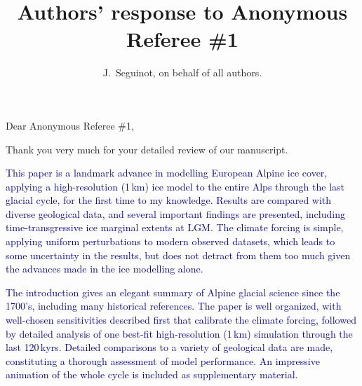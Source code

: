 

\title{Authors' response to Anonymous Referee \#1}
\author{J.~Seguinot, on behalf of all authors.}


\maketitle
\bigskip


\newcommand{\sechead}[1]{\bigskip\noindent\textbf{#1}}
\newcommand{\referee}[1]{\bigskip\noindent\textcolor{darkblue}{#1}}
\newcommand{\msquote}[1]{\begin{quote}\textit{#1}\end{quote}}
\newcommand{\doi}[1]{doi:\allowbreak\href{http://dx.doi.org/#1}{#1}}

    Dear Anonymous Referee \#1,

    Thank you very much for your detailed review of our manuscript.

    \referee{%
        This paper is a landmark advance in modelling European Alpine ice
        cover, applying a high-resolution (1\,km) ice model to the entire Alps
        through the last glacial cycle, for the first time to my knowledge.
        Results are compared with diverse geological data, and several
        important findings are presented, including time-transgressive ice
        marginal extents at LGM. The climate forcing is simple, applying
        uniform perturbations to modern observed datasets, which leads to some
        uncertainty in the results, but does not detract from them too much
        given the advances made in the ice modelling alone.}

    \referee{%
        The introduction gives an elegant summary of Alpine glacial science
        since the 1700's, including many historical references. The paper is
        well organized, with well-chosen sensitivities described first that
        calibrate the climate forcing, followed by detailed analysis of one
        best-fit high-resolution (1\,km) simulation through the last 120\,kyrs.
        Detailed comparisons to a variety of geological data are made,
        constituting a thorough assessment of model performance. An impressive
        animation of the whole cycle is included as supplementary material.}

